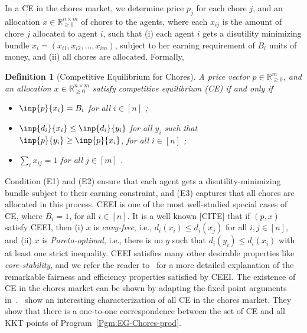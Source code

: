 \documentclass[format=acmsmall,authorversion]{acmart}
\newtheorem{definition}[theorem]{Definition}
\begin{document}
In a CE in the chores market, we determine price $p_j$ for each chore $j$, and an allocation $x \in \mathbb{R}^{n \times m}_{\geq 0}$ of chores to the agents, where each $x_{ij}$ is the amount of chore $j$ allocated to agent $i$, such that (i) each agent $i$ gets a disutility minimizing bundle $x_i = (x_{i1}, x_{i2}, \dots, x_{im})$, subject to her earning requirement of $B_i$ units of money, and (ii) all chores are allocated. Formally,
     
\begin{definition}[Competitive Equilibrium for Chores] 
   \label{Def:CE}
    A price vector $p \in \mathbb{R}^m_{\geq 0}$, and an allocation $x \in \mathbb{R}^{n \times m}_{\geq 0}$ satisfy \emph{competitive equilibrium} (CE) if and only if
    \begin{itemize} 
        \item[(E1)] $\inp{p}{x_i} = B_i$ for all $i \in [n]$ \label{con:Def-CE-1}; 
        \item[(E2)] $\inp{d_i}{x_i} \leq \inp{d_i}{y_i}$ for all $y_i$ such that $\inp{p}{y_i} \geq \inp{p}{x_i}$, for all $i \in [n]$ \label{con:Def-CE-2}; 
        \item[(E3)] $\sum_i x_{ij} = 1$ for all $j \in [m]$ \label{con:Def-CE-3}. 
    \end{itemize}
\end{definition} 
Condition (E1) and (E2) ensure that each agent gets a disutility-minimizing bundle subject to their earning constraint, and (E3) captures that all chores are allocated in this process. CEEI is one of the most well-studied special cases of CE, where $B_i = 1$, for all $i \in [n]$. It is a well known [CITE] that if $(p,x)$ satisfy CEEI, then (i) $x$ is \emph{envy-free}, i.e., $d_i(x_i) \leq d_i(x_j)$ for all $i, j \in [n]$, and (ii) $x$ is \emph{Pareto-optimal}, i.e., there is no $y$ such that $d_i(y_i) \leq d_i(x_i)$ with at least one strict inequality. CEEI satisfies many other desirable properties like \emph{core-stability}, and we refer the reader to~\cite{BogomolnaiaMSY17} for a more detailed explanation of the remarkable fairness and efficiency properties satisfied by CEEI. The existence of CE in the chores market can be shown by adapting the fixed point arguments in~\cite{ArrowD54}.~\cite{BogomolnaiaMSY17} show an interesting characterization of all CE in the chores market. They show that there is a one-to-one correspondence between the set of CE and all KKT points of Program~\ref{Pgm:EG-Chores-prod}.
\end{document}
